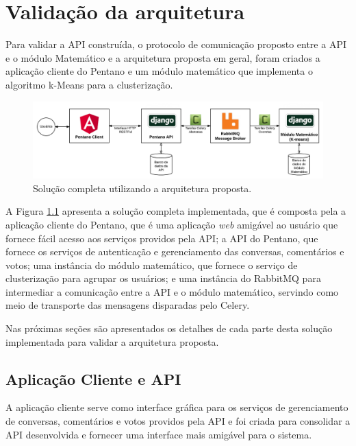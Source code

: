 \chapter{Validação da arquitetura} \label{cap:aplicacao_exemplo}

  Para validar a API construída, o protocolo de comunicação proposto entre a API e o módulo Matemático
  e a arquitetura proposta em geral, foram criados a aplicação cliente do Pentano e um módulo matemático
  que implementa o algoritmo k-Means para a clusterização.
  
  \begin{figure}[h!]
    \centering
    \includegraphics[scale=0.3]{figuras/whole_solution.png}
    \caption{Solução completa utilizando a arquitetura proposta.}
    \label{fig:whole_solution}
  \end{figure}
  
  A Figura \ref{fig:whole_solution} apresenta a solução completa implementada, que
  é composta pela a aplicação cliente do Pentano,
  que é uma aplicação \textit{web} amigável ao usuário que fornece fácil acesso aos serviços providos pela API;
  a API do Pentano, que fornece os serviços
  de autenticação e gerenciamento das conversas, comentários e votos; uma instância do módulo matemático,
  que fornece o serviço de clusterização para agrupar os usuários; e uma instância do RabbitMQ \footnotemark para
  intermediar a comunicação entre a API e o módulo matemático, servindo como meio de transporte das
  mensagens disparadas pelo Celery.
  
  Nas próximas seções são apresentados os detalhes de cada parte desta solução implementada
  para validar a arquitetura proposta.
  
  
  \section{Aplicação Cliente e API}
    
    A aplicação cliente serve como interface gráfica para os serviços de 
    gerenciamento de conversas, comentários e votos providos pela API e foi
    criada para consolidar a API desenvolvida e fornecer uma interface mais
    amigável para o sistema.
    
